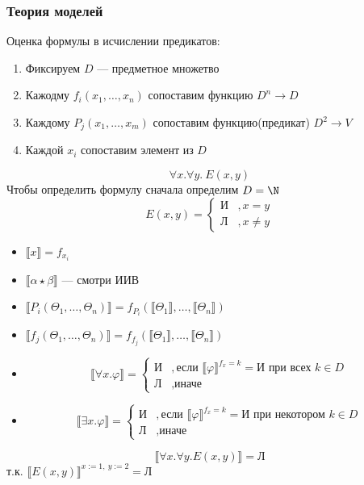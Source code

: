 \documentclass[english]{article}
\begin{document}
\subsubsection{Теория моделей}
\label{sec:orgb68d66d}
Оценка формулы в исчислении предикатов:
\begin{enumerate}
	\item Фиксируем \(D\) --- предметное множетво
	\item Кажодму \(f_i(x_1, \dots, x_n)\) сопоставим функцию \(D^n \to D\)
	\item Каждому \(P_j(x_1, \dots, x_m)\) сопоставим функцию(предикат) \(D^2 \to V\)
	\item Каждой \(x_i\) сопоставим элемент из \(D\)
\end{enumerate}
\begin{examp}
	\[\forall x.\forall y.\ E(x, y)\]
	Чтобы определить формулу сначала определим \(D = \N\)
	\[ E(x, y) = \begin{cases}\text{И} & ,x = y \\ \text{Л} &, x\neq y\end{cases} \]
	\begin{itemize}
		\item \(\llbracket x \rrbracket = f_{x_i}\)
		\item \(\llbracket \alpha \star \beta \rrbracket\) --- смотри ИИВ
		\item \(\llbracket P_i(\Theta_1, \dots , \Theta_n) \rrbracket = f_{P_i}(\llbracket \Theta_1 \rrbracket, \dots, \llbracket \Theta_n \rrbracket)\)
		\item \(\llbracket f_j(\Theta_1 , \dots, \Theta_n ) \rrbracket = f_{f_j}(\llbracket \Theta_1 \rrbracket, \dots, \llbracket \Theta_n \rrbracket)\)
		\item \[ \llbracket \forall x. \varphi \rrbracket = \begin{cases} \text{И} & , \text{если } \llbracket \varphi \rrbracket^{f_x = k} = \text{И}\text{ при всех } k \in D  \\ \text{Л} &,\text{иначе}\end{cases} \]
		\item \[ \llbracket \exists x.\varphi \rrbracket = \begin{cases} \text{И} &, \text{если } \llbracket \varphi \rrbracket^{f_x = k} = \text{И при некотором } k \in D \\ \text{Л} &,\text{иначе} \end{cases} \]
	\end{itemize}
	\[ \llbracket \forall x.\forall y.E(x, y) \rrbracket = \text{Л} \]
	т.к. \(\llbracket E(x, y) \rrbracket^{x:=1,\ y:=2} = \text{Л}\)
\end{examp}
\newcommand{\colorboxed}[2]{\,\color{#1}\fbox{\color{black}#2}\color{black}\,}
\end{document}
